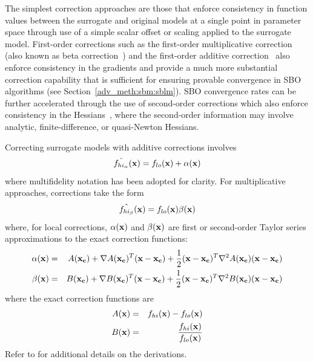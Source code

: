 The simplest correction approaches are those that enforce consistency
in function values between the surrogate and original models at a
single point in parameter space through use of a simple scalar offset
or scaling applied to the surrogate model.  First-order corrections
such as the first-order multiplicative correction (also known as beta
correction~\cite{Cha93}) and the first-order additive
correction~\cite{Lew00} also enforce consistency in the gradients and
provide a much more substantial correction capability that is
sufficient for ensuring provable convergence in SBO algorithms (see
Section~\ref{adv_meth:sbm:sblm}).  SBO convergence rates can be further
accelerated through the use of second-order corrections which also
enforce consistency in the Hessians~\cite{Eld04}, where the
second-order information may involve analytic, finite-difference, or
quasi-Newton Hessians.

Correcting surrogate models with additive corrections involves
\begin{equation}
\hat{f_{hi_{\alpha}}}({\bf x}) = f_{lo}({\bf x}) + \alpha({\bf x}) 
\label{eq:correct_val_add}
\end{equation}
where multifidelity notation has been adopted for clarity.  For
multiplicative approaches, corrections take the form
\begin{equation}
\hat{f_{hi_{\beta}}}({\bf x}) = f_{lo}({\bf x}) \beta({\bf x})
\label{eq:correct_val_mult}
\end{equation}
where, for local corrections, $\alpha({\bf x})$ and $\beta({\bf x})$
are first or second-order Taylor series approximations to the exact
correction functions:
\begin{eqnarray}
\alpha({\bf x}) & = & A({\bf x_c}) + \nabla A({\bf x_c})^T 
({\bf x} - {\bf x_c}) + \frac{1}{2} ({\bf x} - {\bf x_c})^T 
\nabla^2 A({\bf x_c}) ({\bf x} - {\bf x_c}) \label{eq:taylor_a} \\
\beta({\bf x})  & = & B({\bf x_c}) + \nabla B({\bf x_c})^T 
({\bf x} - {\bf x_c}) + \frac{1}{2} ({\bf x} - {\bf x_c})^T \nabla^2 
B({\bf x_c}) ({\bf x} - {\bf x_c}) \label{eq:taylor_b}
\end{eqnarray}
where the exact correction functions are
\begin{eqnarray}
A({\bf x}) & = & f_{hi}({\bf x}) - f_{lo}({\bf x})       \label{eq:exact_A} \\
B({\bf x}) & = & \frac{f_{hi}({\bf x})}{f_{lo}({\bf x})} \label{eq:exact_B}
\end{eqnarray}
Refer to \cite{Eld04} for additional details on the derivations.

